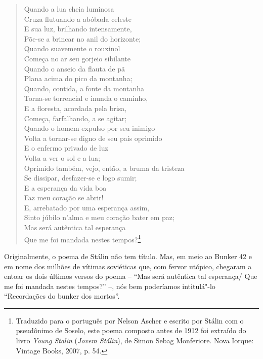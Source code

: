 \begin{verse}
Quando a lua cheia luminosa\\
Cruza flutuando a abóbada celeste\\
E sua luz, brilhando intensamente,\\
Põe-se a brincar no anil do horizonte;\\[5pt]
Quando suavemente o rouxinol\\
Começa no ar seu gorjeio sibilante\\
Quando o anseio da flauta de pã\\
Plana acima do pico da montanha;\\[5pt]
Quando, contida, a fonte da montanha\\
Torna-se torrencial e inunda o caminho,\\
E a floresta, acordada pela brisa,\\
Começa, farfalhando, a se agitar;\\[5pt]
Quando o homem expulso por seu inimigo\\
Volta a tornar-se digno de seu país oprimido\\
E o enfermo privado de luz\\
Volta a ver o sol e a lua;\\[5pt]
Oprimido também, vejo, então, a bruma da \qb{}tristeza\\
Se dissipar, desfazer-se e logo sumir;\\
E a esperança da vida boa\\
Faz meu coração se abrir!\\[5pt]
E, arrebatado por uma esperança assim,\\
Sinto júbilo n'alma e meu coração bater em paz;\\
Mas será autêntica tal esperança\\
Que me foi mandada nestes tempos?\footnote{Traduzido para o português
  por Nelson Ascher e escrito por Stálin com o pseudônimo de Soselo,
  este poema composto antes de 1912 foi extraído do livro \emph{Young
  Stalin} (\emph{Jovem Stálin}), de Simon Sebag Monferiore. Nova Iorque:
  Vintage Books, 2007, p. 54.}
\end{verse}

Originalmente, o poema de Stálin não tem título. Mas, em meio ao Bunker
42 e em nome dos milhões de vítimas soviéticas que, com fervor utópico,
chegaram a entoar os dois últimos versos do poema -- ``Mas será
autêntica tal esperança/ Que me foi mandada nestes tempos?'' --, nós bem
poderíamos intitulá"-lo ``Recordações do bunker dos mortos''.

